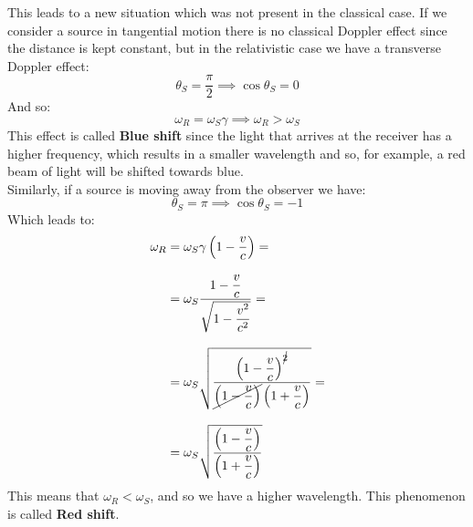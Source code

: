 This leads to a new situation which was not present in the classical case. If we consider a source in tangential motion there is no classical Doppler effect since the distance is kept constant, but in the relativistic case we have a transverse Doppler effect:
\begin{equation}
  \theta_S = \dfrac{\pi}{2} \implies \cos \theta_S = 0
\end{equation}
And so:
\begin{equation}
  \omega_R  = \omega_S \gamma \implies \omega_R  > \omega_S
\end{equation}
This effect is called \textbf{Blue shift} since the light that arrives at the receiver has a higher frequency, which results in a smaller wavelength and so, for example, a red beam of light will be shifted towards blue.\\
Similarly, if a source is moving away from the observer we have:
\begin{equation}
  \theta_S = \pi \implies \cos \theta_S = -1
\end{equation}
Which leads to:
\begin{equation}
  \begin{split}
    \omega_R  &= \omega_S \gamma\left(1 - \dfrac{v}{c}\right) = \\[8pt]
    &= \omega_S \dfrac{1 - \dfrac{v}{c}}{\sqrt{1 - \dfrac{v^2}{c^2}}} = \\[8pt]
    &= \omega_S \sqrt{\dfrac{\left(1 - \dfrac{v}{c}\right)^{\cancel{2}}}{\cancel{\left(1 - \dfrac{v}{c}\right)}\left(1 + \dfrac{v}{c}\right)}} = \\[8pt]
    &= \omega_S \sqrt{\dfrac{\left(1 - \dfrac{v}{c}\right)}{\left(1 + \dfrac{v}{c}\right)}}
  \end{split}
\end{equation}
This means that $\omega_R < \omega_S$, and so we have a higher wavelength. This phenomenon is called \textbf{Red shift}.

